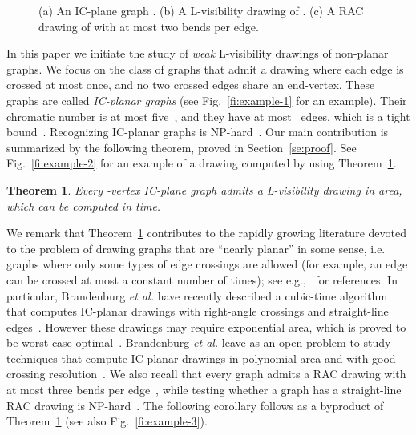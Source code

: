 \documentclass[a4paper]{article}
\newtheorem{theorem}{Theorem}
\begin{document}
\begin{figure}[t]
\centering
{}\hfil
{}\hfil
{}
\caption{\small (a) An IC-plane graph . (b) A L-visibility drawing of . (c) A RAC drawing of  with at most two bends per edge.}
\end{figure}

In this paper we initiate the study of {\em weak} L-visibility drawings of non-planar graphs.  We focus on the class of graphs that admit a drawing where each edge is crossed at most once, and no two crossed edges share an end-vertex. These graphs are called \emph{IC-planar graphs} (see  Fig.~\ref{fi:example-1} for an example). Their chromatic number is at most five~\cite{ks-cpgic-JGT10}, and they have at most~ edges, which is a tight bound~\cite{zl-spgic-CEJM13}. Recognizing IC-planar graphs is NP-hard~\cite{bdek+-rdicg-15}. Our main contribution is summarized by the following theorem, proved in Section~\ref{se:proof}. See Fig.~\ref{fi:example-2} for an example of a drawing computed by using Theorem~\ref{th:main}.

\begin{theorem}\label{th:main}
Every -vertex IC-plane graph  admits a L-visibility drawing in  area, which can be computed in  time.
\end{theorem}

 
We remark that Theorem~\ref{th:main} contributes to the rapidly growing literature devoted to the problem of drawing graphs that are ``nearly planar'' in some sense, i.e. graphs where only some types of edge crossings are allowed (for example, an edge can be crossed at most a constant number of times); see e.g.,~\cite{DBLP:conf/ictcs/Liotta14} for references.  
In particular,  Brandenburg {\em et al.} have recently described a cubic-time algorithm that computes IC-planar drawings with right-angle crossings and straight-line edges~\cite{bdek+-rdicg-15}. However these drawings may require exponential area, which is proved to be worst-case optimal~\cite{bdek+-rdicg-15}.  Brandenburg {\em et al.} leave as an open problem to study techniques that compute IC-planar drawings in polynomial area and with good crossing resolution~\cite{bdek+-rdicg-15}. We also recall that every graph admits a RAC drawing with at most three bends per edge~\cite{DBLP:journals/tcs/DidimoEL11}, while testing whether a graph has a straight-line RAC drawing is NP-hard~\cite{DBLP:journals/jgaa/ArgyriouBS12}. The following corollary follows as a byproduct of Theorem~\ref{th:main} (see also Fig.~\ref{fi:example-3}).
\end{document}
